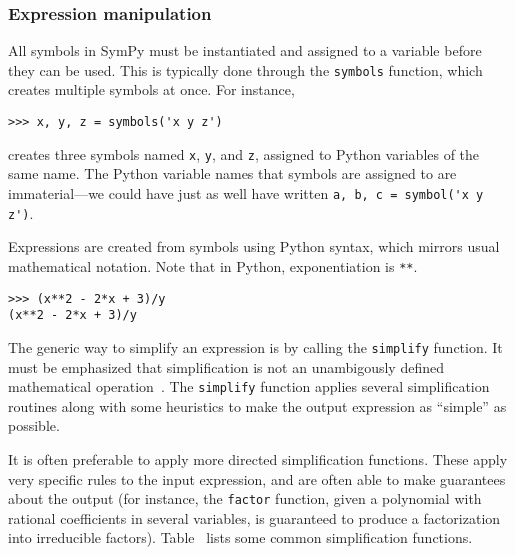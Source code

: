 
\subsubsection{Expression manipulation}


All symbols in SymPy must be instantiated and assigned to a variable before
they can be used. This is typically done through the \texttt{symbols}
function, which creates multiple symbols at once. For instance,

\begin{verbatim}
>>> x, y, z = symbols('x y z')
\end{verbatim}

creates three symbols named \texttt{x}, \texttt{y}, and \texttt{z}, assigned
to Python variables of the same name. The Python variable names that symbols
are assigned to are immaterial---we could have just as well have written
\verb|a, b, c = symbol('x y z')|.

Expressions are created from symbols using Python syntax, which mirrors usual
mathematical notation. Note that in Python, exponentiation is \verb|**|.

\begin{verbatim}
>>> (x**2 - 2*x + 3)/y
(x**2 - 2*x + 3)/y
\end{verbatim}





The generic way to simplify an expression is by calling the \texttt{simplify}
function.
It must be emphasized that simplification is not an unambigously defined
mathematical operation~\cite{Carette2004understanding}.
The \texttt{simplify} function applies several simplification routines along
with some heuristics to make the output expression as ``simple'' as possible.

It is often preferable to apply more directed simplification functions. These
apply very specific rules to the input expression, and are often able to make
guarantees about the output (for instance, the \texttt{factor} function, given
a polynomial with rational coefficients in several variables, is guaranteed to
produce a factorization into irreducible factors).
Table~\label{simplify-table} lists some common simplification functions.

